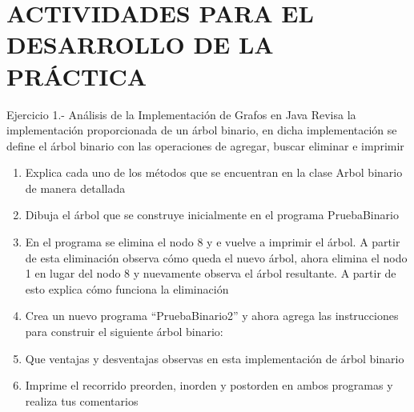 {\centering \section*{ ACTIVIDADES PARA EL DESARROLLO DE LA PRÁCTICA}\par}
\begin{ejercicio}{Ejercicio 1.- Análisis de la Implementación de Grafos en Java}
Revisa la implementación proporcionada de un árbol binario, en dicha implementación se define el árbol binario con las operaciones de agregar, buscar eliminar e imprimir
    \begin{enumerate}
    \item Explica cada uno de los métodos que se encuentran en la clase Arbol binario de manera
detallada
    \item Dibuja el árbol que se construye inicialmente en el programa PruebaBinario
    \item En el programa se elimina el nodo 8 y e vuelve a imprimir el árbol. A partir de esta eliminación
observa cómo queda el nuevo árbol, ahora elimina el nodo 1 en lugar del nodo 8 y nuevamente
observa el árbol resultante. A partir de esto explica cómo funciona la eliminación
    \item Crea un nuevo programa “PruebaBinario2” y ahora agrega las instrucciones para construir el
siguiente árbol binario:
    \item  Que ventajas y desventajas observas en esta implementación de árbol binario
    \item Imprime el recorrido preorden, inorden y postorden en ambos programas y realiza tus
comentarios
    \end{enumerate}
\end{ejercicio}
